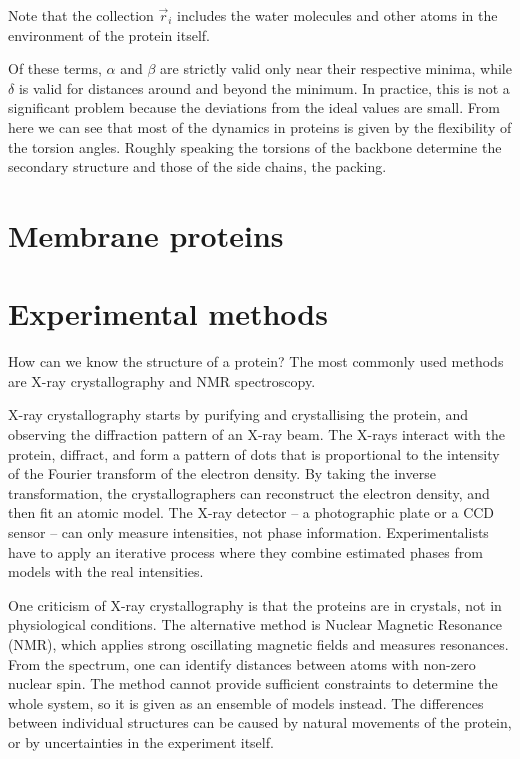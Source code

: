 Note that the collection $\vec r_i$ %
includes the water molecules and other atoms in the environment of the protein itself.

Of these terms, $\alpha$ and $\beta$ are strictly valid only near their respective minima, while $\delta$ is valid for distances around and beyond the minimum.
In practice, this is not a significant problem because the deviations from the ideal values are small. 
From here we can see that most of the dynamics in proteins is given by the flexibility of the torsion angles.
Roughly speaking the torsions of the backbone determine the secondary structure and those of the side chains, the packing.

\section{Membrane proteins}
\section{Experimental methods}
How can we know the structure of a protein?
The most commonly used methods are X-ray crystallography and NMR spectroscopy.

X-ray crystallography starts by
purifying and crystallising the protein, and observing the diffraction pattern of an X-ray beam.
The X-rays interact with the protein, diffract, and form a pattern of dots that is proportional to the intensity of the Fourier transform of the electron density.
By taking the inverse transformation, the crystallographers can reconstruct the electron density, and then fit an atomic model.
The X-ray detector -- a photographic plate or a CCD sensor -- can only measure intensities, not phase information.
Experimentalists have to apply an iterative process where they combine estimated phases from models with the real intensities.

One criticism of X-ray crystallography is that the proteins are in crystals, not in physiological conditions.
The alternative method is Nuclear Magnetic Resonance (NMR),  which applies strong oscillating magnetic fields and measures resonances.
From the spectrum, one can identify distances between atoms with non-zero nuclear spin.
The method cannot provide sufficient constraints to determine the whole system, so it is given as an ensemble of models instead.
The differences between individual structures can be caused by natural movements of the protein, or by uncertainties in the experiment itself.


